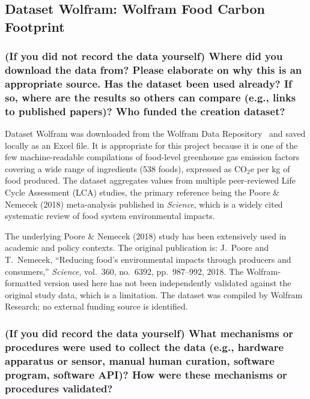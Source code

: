 \documentclass{article}
\newcommand{\question}[1]{#1}
\begin{document}
\subsection*{Dataset Wolfram: Wolfram Food Carbon Footprint}

\question{\subsubsection*{(If you did not record the data yourself) Where did you download the data from? Please elaborate on why this is an appropriate source. Has the dataset been used already? If so, where are the results so others can compare (e.g., links to published papers)? Who funded the creation dataset?}}

Dataset Wolfram was downloaded from the Wolfram Data Repository~\cite{wolfram_carbon} and saved locally as an Excel file. It is appropriate for this project because it is one of the few machine-readable compilations of food-level greenhouse gas emission factors covering a wide range of ingredients (538 foods), expressed as CO$_2$e per kg of food produced. The dataset aggregates values from multiple peer-reviewed Life Cycle Assessment (LCA) studies, the primary reference being the Poore \& Nemecek (2018) meta-analysis published in \textit{Science}, which is a widely cited systematic review of food system environmental impacts.

The underlying Poore \& Nemecek (2018) study has been extensively used in academic and policy contexts. The original publication is: J.\ Poore and T.\ Nemecek, ``Reducing food's environmental impacts through producers and consumers,'' \textit{Science}, vol.\ 360, no.\ 6392, pp.\ 987--992, 2018. The Wolfram-formatted version used here has not been independently validated against the original study data, which is a limitation. The dataset was compiled by Wolfram Research; no external funding source is identified.

\question{\subsubsection*{(If you did record the data yourself) What mechanisms or procedures were used to collect the data (e.g., hardware apparatus or sensor, manual human curation, software program, software API)? How were these mechanisms or procedures validated?}}
\end{document}
